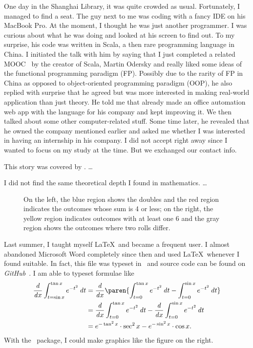	One day in the Shanghai Library, it was quite crowded as usual. Fortunately, I managed to find a seat. The guy next to me was coding with a fancy IDE on his MacBook Pro. At the moment, I thought he was just another programmer. I was curious about what he was doing and looked at his screen to find out. To my surprise, his code was written in Scala, a then rare programming language in China. I initiated the talk with him by saying that I just completed a related MOOC~\cite{FPPS} by the creator of Scala, Martin Odersky and really liked some ideas of the functional programming paradigm (FP). Possibly due to the rarity of FP in China as opposed to object-oriented programming paradigm (OOP), he also replied with surprise that he agreed but was more interested in making real-world application than just theory. He told me that already made an office automation web app with the language for his company and kept improving it. We then talked about some other computer-related stuff. Some time later, he revealed that he owned the company mentioned earlier and asked me whether I was interested in having an internship in his company. I did not accept right away since I wanted to focus on my study at the time. But we exchanged our contact info.
	
	This story was covered by . \dots %
	
	I did not find the same theoretical depth I found in mathematics.
	\dots
	
	\begin{wrapfigure}[8]{r}[.6in]{.4\textwidth}
		\scalebox{.4}{  }
		\caption{On the left, the blue region shows the doubles and the red region indicates the outcomes whose sum is 4 or less; on the right, the yellow region indicates outcomes with at least one 6 and the gray region shows the outcomes where two rolls differ.}
		\label{fig:CondProbEx}
	\end{wrapfigure}
	
	Last summer, I taught myself \LaTeX\ and became a frequent user. I almost abandoned Microsoft Word completely since then and used \LaTeX\ whenever I found suitable. In fact, this file was typeset in \LuaLaTeX\ and source code can be found on \textit{GitHub}~\cite{Readmission}. I am able to typeset formulae like
	\begin{align*}
	\dd x \int_{t=\sin x}^{\tan x} e^{-t^2} \dt
		&= \dd x \paren{\int_{t=0}^{\tan x} e^{-t^2} \dt -
			\int_{t=0}^{\sin x} e^{-t^2} \dt} \\
		&= \dd x \int_{t=0}^{\tan x} e^{-t^2} \dt
			- \dd x \int_{t=0}^{\sin x} e^{-t^2} \dt \\
		&= e^{-\tan^2 x} \cdot \sec^2 x - e^{-\sin^2 x} \cdot \cos x.
	\end{align*}
	With the \TikZ\ package, I could make graphics like the figure on the right.
	
